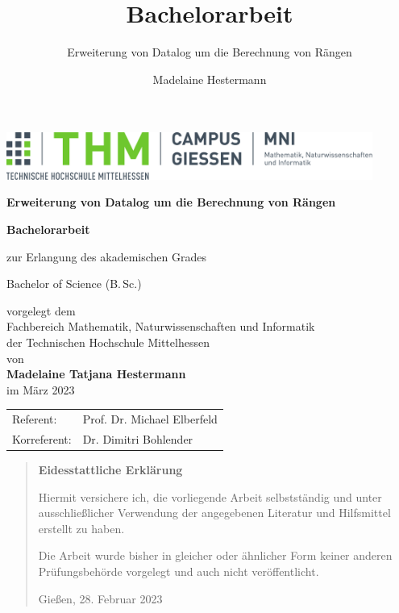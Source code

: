 \documentclass[
a4paper,12pt,listof=toc,bibliography=totoc,twoside, titlepage, headsepline,headings=optiontohead,parskip=half,
BCOR=8.25mm,         %
DIV=12,              %
headsepline=on,      %
]{scrartcl}
\title{Bachelorarbeit}
\subtitle{Erweiterung von Datalog um die Berechnung von Rängen}
\author{Madelaine Hestermann}
\begin{document}
\begin{titlepage}
	\begin{center}
		\includegraphics[width=0.9\textwidth]{img/mni-logo}
		
		\vspace{3cm}	
		
		\huge\textbf{\sffamily Erweiterung von Datalog um die Berechnung von Rängen}
		
		\vspace{1cm}	
		
		\Large\textbf{\sffamily Bachelorarbeit}
		
		\normalsize
		\vspace{0.5cm}	
		
		zur Erlangung des akademischen Grades
		
		Bachelor of Science (B.\,Sc.)
		
		vorgelegt dem\\
		\vspace{0.2cm}
		Fachbereich Mathematik, Naturwissenschaften und Informatik\\
		\vspace{0.2cm}
		der Technischen Hochschule Mittelhessen\\
		
		von \\[1cm]	
		
		\textbf{Madelaine Tatjana Hestermann}\\ [.5cm] 
		im März 2023
	\end{center}
	\vfill
	\begin{tabular}{ll}
		Referent: & Prof. Dr. Michael Elberfeld\\ 
		Korreferent: & Dr. Dimitri Bohlender\\ 
	\end{tabular}
\end{titlepage}
\cleardoubleemptypage


\pagestyle{empty}
\begin{quote}
	\vspace*{4cm}
	
	\begin{center}
		\textbf{\Large\sffamily Eidesstattliche Erklärung}
	\end{center}
	\vspace{0.5cm}

	Hiermit versichere ich, die vorliegende Arbeit selbstständig und unter
	ausschließlicher Verwendung der angegebenen Literatur und Hilfsmittel
	erstellt zu haben.
	
	\vspace{0.3cm}
	Die Arbeit wurde bisher in gleicher oder ähnlicher Form keiner anderen
	Prü\-fungs\-be\-hör\-de vorgelegt und auch nicht veröffentlicht.
	\vspace{3em}
	
	Gießen, 28. Februar 2023
\end{quote}
\cleardoubleemptypage
\end{document}
